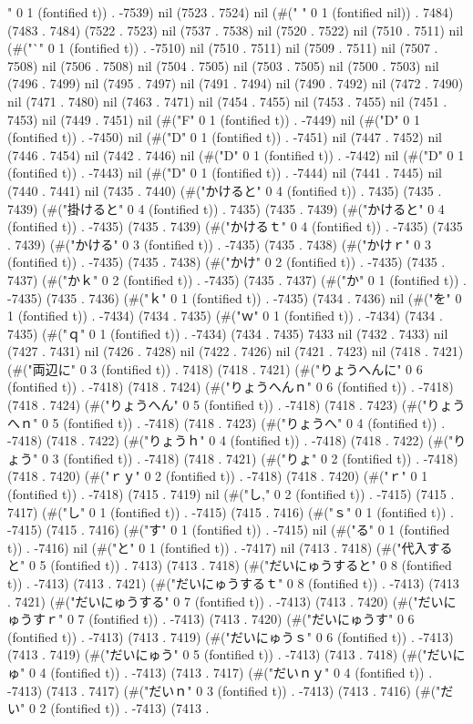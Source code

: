 {" 0 1 (fontified t)) . -7539) nil (7523 . 7524) nil (#(" " 0 1 (fontified nil)) . 7484) (7483 . 7484) (7522 . 7523) nil (7537 . 7538) nil (7520 . 7522) nil (7510 . 7511) nil (#("`" 0 1 (fontified t)) . -7510) nil (7510 . 7511) nil (7509 . 7511) nil (7507 . 7508) nil (7506 . 7508) nil (7504 . 7505) nil (7503 . 7505) nil (7500 . 7503) nil (7496 . 7499) nil (7495 . 7497) nil (7491 . 7494) nil (7490 . 7492) nil (7472 . 7490) nil (7471 . 7480) nil (7463 . 7471) nil (7454 . 7455) nil (7453 . 7455) nil (7451 . 7453) nil (7449 . 7451) nil (#("F" 0 1 (fontified t)) . -7449) nil (#("D" 0 1 (fontified t)) . -7450) nil (#("D" 0 1 (fontified t)) . -7451) nil (7447 . 7452) nil (7446 . 7454) nil (7442 . 7446) nil (#("D" 0 1 (fontified t)) . -7442) nil (#("D" 0 1 (fontified t)) . -7443) nil (#("D" 0 1 (fontified t)) . -7444) nil (7441 . 7445) nil (7440 . 7441) nil (7435 . 7440) (#("かけると" 0 4 (fontified t)) . 7435) (7435 . 7439) (#("掛けると" 0 4 (fontified t)) . 7435) (7435 . 7439) (#("かけると" 0 4 (fontified t)) . -7435) (7435 . 7439) (#("かけるｔ" 0 4 (fontified t)) . -7435) (7435 . 7439) (#("かける" 0 3 (fontified t)) . -7435) (7435 . 7438) (#("かけｒ" 0 3 (fontified t)) . -7435) (7435 . 7438) (#("かけ" 0 2 (fontified t)) . -7435) (7435 . 7437) (#("かｋ" 0 2 (fontified t)) . -7435) (7435 . 7437) (#("か" 0 1 (fontified t)) . -7435) (7435 . 7436) (#("ｋ" 0 1 (fontified t)) . -7435) (7434 . 7436) nil (#("を" 0 1 (fontified t)) . -7434) (7434 . 7435) (#("ｗ" 0 1 (fontified t)) . -7434) (7434 . 7435) (#("ｑ" 0 1 (fontified t)) . -7434) (7434 . 7435) 7433 nil (7432 . 7433) nil (7427 . 7431) nil (7426 . 7428) nil (7422 . 7426) nil (7421 . 7423) nil (7418 . 7421) (#("両辺に" 0 3 (fontified t)) . 7418) (7418 . 7421) (#("りょうへんに" 0 6 (fontified t)) . -7418) (7418 . 7424) (#("りょうへんｎ" 0 6 (fontified t)) . -7418) (7418 . 7424) (#("りょうへん" 0 5 (fontified t)) . -7418) (7418 . 7423) (#("りょうへｎ" 0 5 (fontified t)) . -7418) (7418 . 7423) (#("りょうへ" 0 4 (fontified t)) . -7418) (7418 . 7422) (#("りょうｈ" 0 4 (fontified t)) . -7418) (7418 . 7422) (#("りょう" 0 3 (fontified t)) . -7418) (7418 . 7421) (#("りょ" 0 2 (fontified t)) . -7418) (7418 . 7420) (#("ｒｙ" 0 2 (fontified t)) . -7418) (7418 . 7420) (#("ｒ" 0 1 (fontified t)) . -7418) (7415 . 7419) nil (#("し," 0 2 (fontified t)) . -7415) (7415 . 7417) (#("し" 0 1 (fontified t)) . -7415) (7415 . 7416) (#("ｓ" 0 1 (fontified t)) . -7415) (7415 . 7416) (#("す" 0 1 (fontified t)) . -7415) nil (#("る" 0 1 (fontified t)) . -7416) nil (#("と" 0 1 (fontified t)) . -7417) nil (7413 . 7418) (#("代入すると" 0 5 (fontified t)) . 7413) (7413 . 7418) (#("だいにゅうすると" 0 8 (fontified t)) . -7413) (7413 . 7421) (#("だいにゅうするｔ" 0 8 (fontified t)) . -7413) (7413 . 7421) (#("だいにゅうする" 0 7 (fontified t)) . -7413) (7413 . 7420) (#("だいにゅうすｒ" 0 7 (fontified t)) . -7413) (7413 . 7420) (#("だいにゅうす" 0 6 (fontified t)) . -7413) (7413 . 7419) (#("だいにゅうｓ" 0 6 (fontified t)) . -7413) (7413 . 7419) (#("だいにゅう" 0 5 (fontified t)) . -7413) (7413 . 7418) (#("だいにゅ" 0 4 (fontified t)) . -7413) (7413 . 7417) (#("だいｎｙ" 0 4 (fontified t)) . -7413) (7413 . 7417) (#("だいｎ" 0 3 (fontified t)) . -7413) (7413 . 7416) (#("だい" 0 2 (fontified t)) . -7413) (7413 . }
